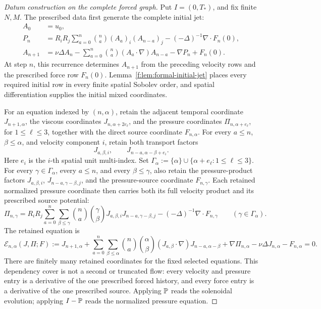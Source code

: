 \begin{proof}[Datum construction on the complete forced graph]
Put \(I=(0,T_*)\), and fix finite \(N,M\).  The prescribed data first generate
the complete initial jet:
\[
 \begin{aligned}
 A_0&=u_0,\\
 P_n&=R_iR_j\sum_{a=0}^n\binom na(A_a)_i(A_{n-a})_j
      -(-\Delta)^{-1}\nabla\cdot F_n(0),\\
 A_{n+1}&=\nu\Delta A_n
 -\sum_{a=0}^n\binom na(A_a\cdot\nabla)A_{n-a}
 -\nabla P_n+F_n(0).
 \end{aligned}
\]
At step \(n\), this recurrence determines \(A_{n+1}\) from the preceding
velocity rows and the prescribed force row \(F_n(0)\).
Lemma~\ref{f:lem:formal-initial-jet} places every required initial row in every
finite spatial Sobolev order, and spatial differentiation supplies the initial
mixed coordinates.

For an equation indexed by \((n,\alpha)\), retain the adjacent temporal
coordinate \(J_{n+1,\alpha}\), the viscous coordinates
\(J_{n,\alpha+2e_\ell}\), and the pressure coordinates
\(\Pi_{n,\alpha+e_\ell}\), for \(1\le\ell\le3\), together with the direct
source coordinate \(F_{n,\alpha}\).  For every \(a\le n\),
\(\beta\le\alpha\), and velocity component \(i\), retain both transport
factors
\[
 J_{a,\beta,i},
 \qquad
 J_{n-a,\alpha-\beta+e_i}.
\]
Here \(e_i\) is the \(i\)-th spatial unit multi-index.  Set
\(\Gamma_\alpha:=\{\alpha\}\cup\{\alpha+e_\ell:1\le\ell\le3\}\).
For every \(\gamma\in\Gamma_\alpha\), every \(a\le n\), and every
\(\beta\le\gamma\), also retain the pressure-product factors
\(J_{a,\beta,i}\), \(J_{n-a,\gamma-\beta,j}\), and the pressure-source
coordinate \(F_{n,\gamma}\).  Each retained normalized pressure coordinate
then carries both its full velocity product and its prescribed source
potential:
\[
 \Pi_{n,\gamma}
 =R_iR_j\sum_{a=0}^n\sum_{\beta\le\gamma}
 \binom na\binom{\gamma}{\beta}
 J_{a,\beta,i}J_{n-a,\gamma-\beta,j}
 -(-\Delta)^{-1}\nabla\cdot F_{n,\gamma}
 \qquad(\gamma\in\Gamma_\alpha).
\]
The retained equation is
\begin{equation}
 \mathscr E_{n,\alpha}(J,\Pi;F)
 :=J_{n+1,\alpha}
 +\sum_{a=0}^{n}\sum_{\beta\le\alpha}
  \binom na\binom{\alpha}{\beta}
  (J_{a,\beta}\cdot\nabla)J_{n-a,\alpha-\beta}
 +\nabla\Pi_{n,\alpha}
 -\nu\Delta J_{n,\alpha}-F_{n,\alpha}=0.
 \label{f:eq:forced-finite-equation-graph}
\end{equation}
There are finitely many retained coordinates for the fixed selected equations.
This dependency cover is not a second or truncated flow: every velocity and
pressure entry is a derivative of the one prescribed forced history, and
every force entry is a derivative of the one prescribed source.  Applying
\(\mathbb P\) reads the solenoidal evolution; applying \(I-\mathbb P\) reads the
normalized pressure equation.


\end{proof}
